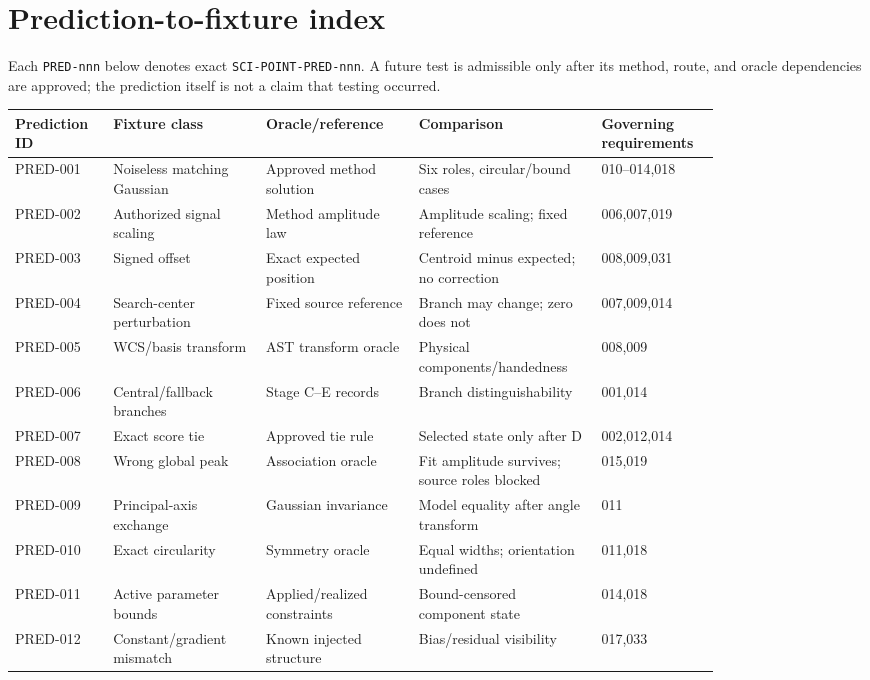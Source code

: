 \documentclass[11pt]{article}
\renewcommand{\arraystretch}{1.12}
\begin{document}
\section{Prediction-to-fixture index}

Each \texttt{PRED-nnn} below denotes exact
\texttt{SCI-POINT-PRED-nnn}. A future test is admissible only after its method,
route, and oracle dependencies are approved; the prediction itself is not a
claim that testing occurred.

{\small
\renewcommand{\arraystretch}{1.18}
\begin{longtable}{@{}P{0.11\linewidth}P{0.19\linewidth}P{0.19\linewidth}P{0.20\linewidth}P{0.13\linewidth}@{}}
\toprule
Prediction ID & Fixture class & Oracle/reference & Comparison & Governing requirements \\
\midrule
\endhead
PRED-001 & Noiseless matching Gaussian & Approved method solution & Six roles, circular/bound cases & 010--014,018 \\
PRED-002 & Authorized signal scaling & Method amplitude law & Amplitude scaling; fixed reference & 006,007,019 \\
PRED-003 & Signed offset & Exact expected position & Centroid minus expected; no correction & 008,009,031 \\
PRED-004 & Search-center perturbation & Fixed source reference & Branch may change; zero does not & 007,009,014 \\
PRED-005 & WCS/basis transform & AST transform oracle & Physical components/handedness & 008,009 \\
PRED-006 & Central/fallback branches & Stage C--E records & Branch distinguishability & 001,014 \\
PRED-007 & Exact score tie & Approved tie rule & Selected state only after D & 002,012,014 \\
PRED-008 & Wrong global peak & Association oracle & Fit amplitude survives; source roles blocked & 015,019 \\
PRED-009 & Principal-axis exchange & Gaussian invariance & Model equality after angle transform & 011 \\
PRED-010 & Exact circularity & Symmetry oracle & Equal widths; orientation undefined & 011,018 \\
PRED-011 & Active parameter bounds & Applied/realized constraints & Bound-censored component state & 014,018 \\
PRED-012 & Constant/gradient mismatch & Known injected structure & Bias/residual visibility & 017,033 \\

\end{longtable}}
\end{document}
